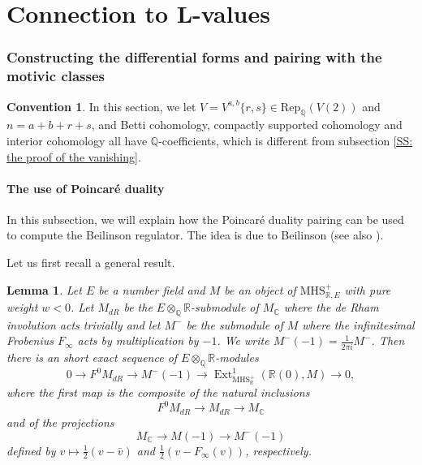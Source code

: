 \documentclass[11pt, a4paper]{amsart}
\theoremstyle{plain}
\newtheorem{lemma}[theorem]{Lemma}
\theoremstyle{definition}
\newtheorem{convention}[theorem]{Convention}
\numberwithin{equation}{section}
\def\CC{\mathbb{C}}
\def\QQ{\mathbb{Q}}
\def\RR{\mathbb{R}}
\DeclareMathOperator{\Ext}{Ext}
\begin{document}

\clearpage

\part{Connection to L-values}

\section{Constructing the differential forms and pairing with the motivic classes}
\label{Sec: the differential form and the pairing}

\begin{convention}
     In this section, we let $V = V^{a,b}\{r, s\} \in \mathrm{Rep}_{\QQ}(V(2))$ and $n = a + b + r + s$, and Betti cohomology, compactly supported cohomology and interior cohomology all have $\QQ$-coefficients, which is different from subsection \ref{SS: the proof of the vanishing}.
\end{convention}

\subsection{The use of Poincar\'{e} duality}
\label{SS: Poincare duality}
In this subsection, we will explain how the Poincar\'{e} duality pairing can be used to compute the Beilinson regulator. 
The idea is due to Beilinson \cite{Beilinson_Modular_Curve} (see also \cite{Kings98}). 

\par Let us first recall a general result.
\begin{lemma}\textnormal{\cite[Lemma 4.11]{LemmaII17}}
\label{Lemma: def of Ext^{1}}
    Let $E$ be a number field and $M$ be an object of $\mathrm{MHS}_{\RR, E}^{+}$ with pure weight $w < 0$. Let $M_{dR}$ be the $E\otimes_{\QQ}{\RR}$-submodule of $M_{\CC}$ where the de Rham involution acts trivially and let $M^{-}$ be the submodule of $M$ where the infinitesimal Frobenius $F_{\infty}$ acts by multiplication by $-1$. We write $M^{-}(-1) = \frac{1}{2 \pi i} M^{-}$. Then there is an short exact sequence of $E \otimes_{\QQ}{\RR}$-modules
    \begin{equation*}
        0 \rightarrow F^{0}M_{dR} \rightarrow M^{-}(-1) \rightarrow \Ext^{1}_{\mathrm{MHS_{\RR}^{+}}}(\RR(0), M) \rightarrow 0,  
    \end{equation*}
    where the first map is the composite of the natural inclusions 
    \begin{equation*}
        F^{0}M_{dR} \rightarrow M_{dR} \rightarrow M_{\CC}
    \end{equation*}
    and of the projections 
    \begin{equation*}
        M_{\CC} \rightarrow M(-1) \rightarrow M^{-}(-1)
    \end{equation*}
    defined by $v \mapsto \frac{1}{2}(v - \bar{v})$ and $\frac{1}{2}(v - F_{\infty}(v))$, respectively. 
\end{lemma}
\end{document}
